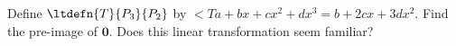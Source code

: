 Define $\ltdefn{T}{P_3}{P_2}$ by 
$\lt{T}{a + bx + cx^2 + dx^3} = b + 2cx + 3dx^2$.  
Find the pre-image of $\mathbf{0}$.  
Does this linear transformation seem familiar?